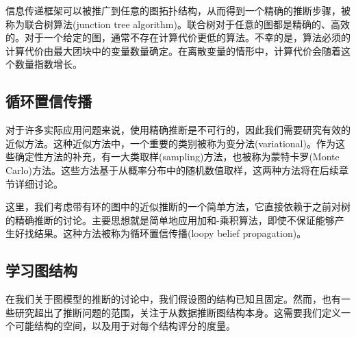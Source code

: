 信息传递框架可以被推广到任意的图拓扑结构，从而得到一个精确的推断步骤，被称为联合树算法(junction tree algorithm)。联合树对于任意的图都是精确的、高效的。对于一个给定的图，通常不存在计算代价更低的算法。不幸的是，算法必须的计算代价由最大团块中的变量数量确定。在离散变量的情形中，计算代价会随着这个数量指数增长。
\subsection*{循环置信传播}
对于许多实际应用问题来说，使用精确推断是不可行的，因此我们需要研究有效的近似方法。这种近似方法中，一个重要的类别被称为变分法(variational)。作为这些确定性方法的补充，有一大类取样(sampling)方法，也被称为蒙特卡罗(Monte Carlo)方法。这些方法基于从概率分布中的随机数值取样，这两种方法将在后续章节详细讨论。

这里，我们考虑带有环的图中的近似推断的一个简单方法，它直接依赖于之前对树的精确推断的讨论。主要思想就是简单地应用加和-乘积算法，即使不保证能够产生好找结果。这种方法被称为循环置信传播(loopy belief propagation)。
\subsection*{学习图结构}
在我们关于图模型的推断的讨论中，我们假设图的结构已知且固定。然而，也有一些研究超出了推断问题的范围，关注于从数据推断图结构本身。这需要我们定义一个可能结构的空间，以及用于对每个结构评分的度量。